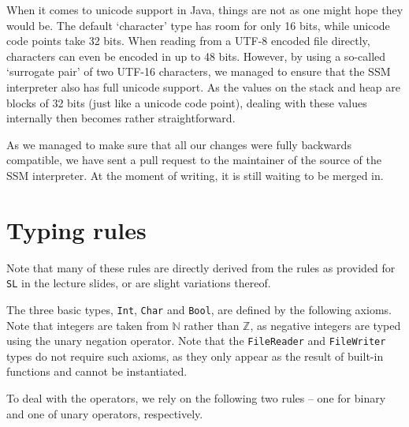\documentclass[a4paper]{article}
\begin{document}
When it comes to unicode support in Java, things are not as one might hope they would be. The default `character' type has room for only 16 bits, while unicode code points take 32 bits. When reading from a UTF-8 encoded file directly, characters can even be encoded in up to 48 bits. However, by using a so-called `surrogate pair' of two UTF-16 characters, we managed to ensure that the SSM interpreter also has full unicode support. As the values on the stack and heap are blocks of 32 bits (just like a unicode code point), dealing with these values internally then becomes rather straightforward.

As we managed to make sure that all our changes were fully backwards compatible, we have sent a pull request to the maintainer of the source of the SSM interpreter. At the moment of writing, it is still waiting to be merged in.

\section{Typing rules}

Note that many of these rules are directly derived from the rules as provided for {\tt SL} in the lecture slides, or are slight variations thereof.

The three basic types, {\tt Int}, {\tt Char} and {\tt Bool}, are defined by the following axioms. Note that integers are taken from $\mathbb{N}$ rather than $\mathbb{Z}$, as negative integers are typed using the unary negation operator. Note that the {\tt FileReader} and {\tt FileWriter} types do not require such axioms, as they only appear as the result of built-in functions and cannot be instantiated.

{\sf
\begin{prooftree}
\end{prooftree}
}

{\sf
\begin{prooftree}
\end{prooftree}
}

{\sf
\begin{prooftree}
\end{prooftree}
}

To deal with the operators, we rely on the following two rules -- one for binary and one of unary operators, respectively.
\end{document}
